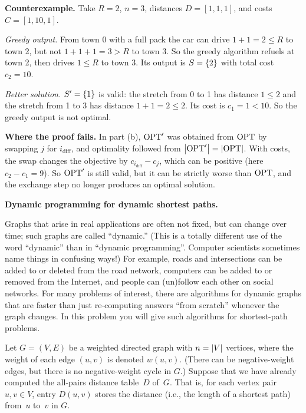 \documentclass[11pt,addpoints,answers]{exam}
\begin{document}
\begin{questions}
\begin{parts}
\begin{solution}
      \textbf{Counterexample.}
      Take $R = 2$, $n = 3$, distances $D = [1,1,1]$, and costs $C = [1, 10, 1]$.

      \emph{Greedy output.}
      From town 0 with a full pack the car can drive $1+1 = 2 \le R$ to town 2, but not $1+1+1 = 3 > R$ to town 3.
      So the greedy algorithm refuels at town 2, then drives $1 \le R$ to town 3.
      Its output is $S = \left\{2\right\}$ with total cost $c_2 = 10$.

      \emph{Better solution.}
      $S' = \left\{1\right\}$ is valid: the stretch from 0 to 1 has distance $1 \le 2$ and the stretch from 1 to 3 has distance $1+1 = 2 \le 2$.
      Its cost is $c_1 = 1 < 10$.
      So the greedy output is not optimal.

      \textbf{Where the proof fails.}
      In part (b), $\mathrm{OPT}'$ was obtained from $\mathrm{OPT}$ by swapping $j$ for $i_{\text{diff}}$, and optimality followed from $\left|\mathrm{OPT}'\right| = \left|\mathrm{OPT}\right|$.
      With costs, the swap changes the objective by $c_{i_{\text{diff}}} - c_j$, which can be positive (here $c_2 - c_1 = 9$).
      So $\mathrm{OPT}'$ is still valid, but it can be strictly worse than $\mathrm{OPT}$, and the exchange step no longer produces an optimal solution.
    \end{solution}
  \end{parts}

  
  \question \textbf{Dynamic programming for dynamic shortest paths.} \nopagebreak
             
  Graphs that arise in real applications are often not fixed, but can change over time; such graphs are called ``dynamic.''
  (This is a totally different use of the word ``dynamic'' than in ``dynamic programming''.
  Computer scientists sometimes name things in confusing ways!)
  For example, roads and intersections can be added to or deleted from the road network, computers can be added to or removed from the Internet, and people can (un)follow each other on social networks.
  For many problems of interest, there are algorithms for dynamic graphs that are faster than just re-computing answers ``from scratch'' whenever the graph changes.
  In this problem you will give such algorithms for shortest-path problems.

  \vspace{1.0cm}
  
  Let $G=(V, E)$ be a weighted directed graph with $n=\left|V\right|$ vertices, where the weight of each edge $(u,v)$ is denoted $w(u,v)$.
  (There can be negative-weight edges, but there is no negative-weight cycle in $G$.)
  Suppose that we have already computed the all-pairs distance table~$D$ of~$G$.
  That is, for each vertex pair $u,v \in V$, entry $D(u,v)$ stores the distance (i.e., the length of a shortest path) from~$u$ to~$v$ in $G$.


\end{questions}
\end{document}
